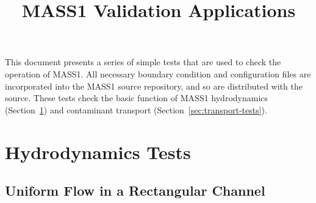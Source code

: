 \documentclass[12pt,dvips,letterpaper]{article}
\title{MASS1 Validation Applications}
\begin{document}
\maketitle{}
\tableofcontents{}

\vspace{0.5in}

This document presents a series of simple tests that are used to check
the operation of MASS1. All necessary boundary condition and
configuration files are incorporated into the MASS1 source
repository, and so are distributed with the source.  These tests
check the basic function of  MASS1 hydrodynamics
(Section~\ref{sec:hydro-tests}) and contaminant transport
(Section~\ref{sec:transport-tests}).  

\section{Hydrodynamics Tests}
\label{sec:hydro-tests}


\subsection{Uniform Flow in a Rectangular Channel}
\label{sec:normal-flow}

\end{document}
